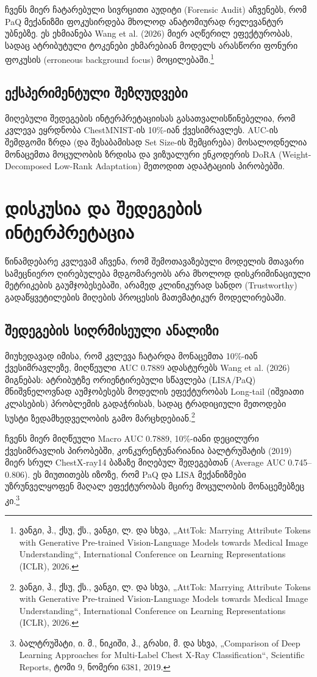 \documentclass[12pt,a4paper,oneside]{report}
\begin{document}
ჩვენს მიერ ჩატარებული სივრცითი აუდიტი (Forensic Audit) აჩვენებს, რომ PaQ მექანიზმი ფოკუსირდება მხოლოდ ანატომიურად რელევანტურ უბნებზე. ეს ეხმიანება Wang et al. (2026) მიერ აღწერილ ეფექტურობას, სადაც ატრიბუტული ტოკენები ეხმარებიან მოდელს არასწორი ფონური ფოკუსის (erroneous background focus) მოცილებაში.\footnote{ვანგი, ჰ., ქსუ, ქს., ვანგი, ლ. და სხვა, „AttTok: Marrying Attribute Tokens with Generative Pre-trained Vision-Language Models towards Medical Image Understanding“, International Conference on Learning Representations (ICLR), 2026.}

\section{ექსპერიმენტული შეზღუდვები}
მიღებული შედეგების ინტერპრეტაციისას გასათვალისწინებელია, რომ კვლევა ეყრდნობა ChestMNIST-ის 10\%-იან ქვესიმრავლეს. AUC-ის შემდგომი ზრდა (და შესაბამისად Set Size-ის შემცირება) მოსალოდნელია მონაცემთა მოცულობის ზრდისა და ვიზუალური ენკოდერის DoRA (Weight-Decomposed Low-Rank Adaptation) მეთოდით ადაპტაციის პირობებში.

\chapter{დისკუსია და შედეგების ინტერპრეტაცია}

წინამდებარე კვლევამ აჩვენა, რომ შემოთავაზებული მოდელის მთავარი სამეცნიერო ღირებულება მდგომარეობს არა მხოლოდ დისკრიმინაციული მეტრიკების გაუმჯობესებაში, არამედ კლინიკურად სანდო (Trustworthy) გადაწყვეტილების მიღების პროცესის მათემატიკურ მოდელირებაში.

\section{შედეგების სიღრმისეული ანალიზი}
მიუხედავად იმისა, რომ კვლევა ჩატარდა მონაცემთა 10\%-იან ქვესიმრავლეზე, მიღწეული AUC 0.7889 ადასტურებს Wang et al. (2026) მიგნებას: ატრიბუტზე ორიენტირებული სწავლება (LISA/PaQ) მნიშვნელოვნად აუმჯობესებს მოდელის ეფექტურობას Long-tail (იშვიათი კლასების) პრობლემის გადაჭრისას, სადაც ტრადიციული მეთოდები სუსტი ზედამხედველობის გამო მარცხდებიან.\footnote{ვანგი, ჰ., ქსუ, ქს., ვანგი, ლ. და სხვა, „AttTok: Marrying Attribute Tokens with Generative Pre-trained Vision-Language Models towards Medical Image Understanding“, International Conference on Learning Representations (ICLR), 2026.}

ჩვენს მიერ მიღწეული Macro AUC 0.7889, 10\%-იანი დეცილური ქვესიმრავლის პირობებში, კონკურენტუნარიანია ბალტრუშატის (2019) მიერ სრულ ChestX-ray14 ბაზაზე მიღებულ შედეგებთან (Average AUC 0.745--0.806). ეს მიუთითებს იზოზე, რომ PaQ და LISA მექანიზმები უზრუნველყოფენ მაღალ ეფექტურობას მცირე მოცულობის მონაცემებზეც კი.\footnote{ბალტრუშატი, ი. მ., ნიკიში, ჰ., გრასი, მ. და სხვა, „Comparison of Deep Learning Approaches for Multi-Label Chest X-Ray Classification“, Scientific Reports, ტომი 9, ნომერი 6381, 2019.}
\end{document}
